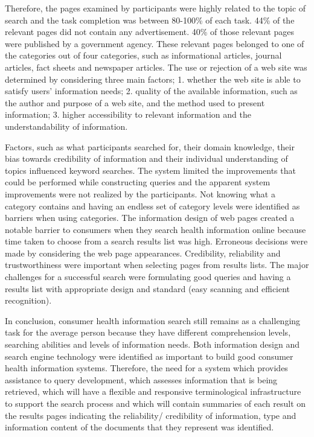\documentclass[]{article}
\begin{document}
Therefore, the pages examined by participants were highly related to the topic of search and the task completion was between 80-100\% of each task. 44\% of the relevant pages did not contain any advertisement. 40\% of those relevant pages were published by a government agency. These relevant pages belonged to one of the categories out of four categories, such as informational articles, journal articles, fact sheets and newspaper articles. The use or rejection of a web site was determined by considering three main factors; 1. whether the web site is able to satisfy users' information needs; 2. quality of the available information, such as the author and purpose of a web site, and the method used to present information; 3. higher accessibility to relevant information and the understandability of information.  

Factors, such as what participants searched for, their domain knowledge, their bias towards credibility of information and their individual understanding of topics influenced keyword searches. The system limited the improvements that could be performed while constructing queries and the apparent system improvements were not realized by the participants. Not knowing what a category contains and having an endless set of category levels were identified as barriers when using categories. The information design of web pages created a notable barrier to consumers when they search health information online because time taken to choose from a search results list was high. Erroneous decisions were made by considering the web page appearances. Credibility, reliability and trustworthiness were important when selecting pages from results lists. The major challenges for a successful search were formulating good queries and having a results list with appropriate design and standard (easy scanning and efficient recognition).  

In conclusion, consumer health information search still remains as a challenging task for the average person because they have different comprehension levels, searching abilities and levels of information needs. Both information design and search engine technology were identified as important to build good consumer health information systems. Therefore, the need for a system which provides assistance to query development, which assesses information that is being retrieved, which will have a flexible and responsive terminological infrastructure to support the search process and which will contain summaries of each result on the results pages indicating the reliability/ credibility of information, type and information content of the documents that they represent was identified.   
\end{document}
